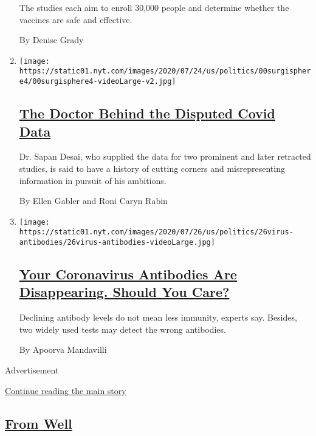 \begin{enumerate}
  The studies each aim to enroll 30,000 people and determine whether the
  vaccines are safe and effective.

  By Denise Grady
\item
  \texttt{[image: https://static01.nyt.com/images/2020/07/24/us/politics/00surgisphere4/00surgisphere4-videoLarge-v2.jpg]}

  \hypertarget{the-doctor-behind-the-disputed-covid-data}{%
  \subsection{\texorpdfstring{\href{/2020/07/27/science/coronavirus-retracted-studies-data.html}{The
  Doctor Behind the Disputed Covid
  Data}}{The Doctor Behind the Disputed Covid Data}}\label{the-doctor-behind-the-disputed-covid-data}}

  Dr. Sapan Desai, who supplied the data for two prominent and later
  retracted studies, is said to have a history of cutting corners and
  misrepresenting information in pursuit of his ambitions.

  By Ellen Gabler and Roni Caryn Rabin
\item
  \texttt{[image: https://static01.nyt.com/images/2020/07/26/us/politics/26virus-antibodies/26virus-antibodies-videoLarge.jpg]}

  \hypertarget{your-coronavirus-antibodies-are-disappearing-should-you-care}{%
  \subsection{\texorpdfstring{\href{/2020/07/26/health/coronvirus-antibody-tests.html}{Your
  Coronavirus Antibodies Are Disappearing. Should You
  Care?}}{Your Coronavirus Antibodies Are Disappearing. Should You Care?}}\label{your-coronavirus-antibodies-are-disappearing-should-you-care}}

  Declining antibody levels do not mean less immunity, experts say.
  Besides, two widely used tests may detect the wrong antibodies.

  By Apoorva Mandavilli
\end{enumerate}

Advertisement

\protect\hyperlink{after-mid1}{Continue reading the main story}

\hypertarget{from-well}{%
\subsection{\texorpdfstring{\href{/section/well}{From
Well}}{From Well}}\label{from-well}}

